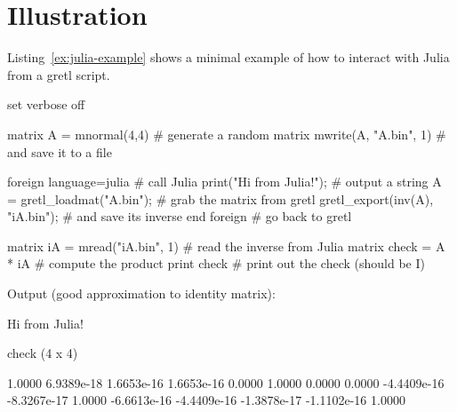 \section{Illustration}

Listing~\ref{ex:julia-example} shows a minimal example of how to interact
with Julia from a gretl script.

\begin{script}[htbp]
\begin{scode}
set verbose off

matrix A = mnormal(4,4)                # generate a random matrix
mwrite(A, "A.bin", 1)                  # and save it to a file

foreign language=julia                 # call Julia
    print("Hi from Julia!\n");         # output a string
    A = gretl_loadmat("A.bin");        # grab the matrix from gretl
    gretl_export(inv(A), "iA.bin");    # and save its inverse
end foreign                            # go back to gretl

matrix iA = mread("iA.bin", 1)         # read the inverse from Julia
matrix check = A * iA                  # compute the product
print check                            # print out the check (should be I)
\end{scode}
Output (good approximation to identity matrix):
\begin{outbit}
Hi from Julia!

check (4 x 4)

      1.0000   6.9389e-18   1.6653e-16   1.6653e-16 
      0.0000       1.0000       0.0000       0.0000 
 -4.4409e-16  -8.3267e-17       1.0000  -6.6613e-16 
 -4.4409e-16  -1.3878e-17  -1.1102e-16       1.0000 
\end{outbit}
\end{script}


